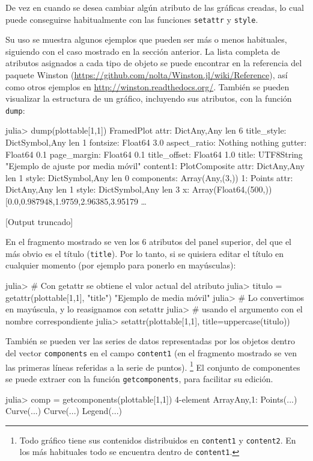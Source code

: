 ﻿\documentclass{article}
\newcommand{\code}{\texttt}
\begin{document}
De vez en cuando se desea cambiar algún atributo de las gráficas creadas, lo cual puede conseguirse habitualmente con las funciones \code{setattr} y \code{style}.

Su uso se muestra algunos ejemplos que pueden ser más o menos habituales, siguiendo con el caso mostrado en la sección anterior. La lista completa de atributos asignados a cada tipo de objeto se puede encontrar en la referencia del paquete Winston (\url{https://github.com/nolta/Winston.jl/wiki/Reference}), así como otros ejemplos en \url{http://winston.readthedocs.org/}. También se pueden visualizar la estructura de un gráfico, incluyendo sus atributos, con la función \code{dump}:
 
julia> dump(plottable[1,1])
FramedPlot 
  attr: Dict{Any,Any} len 6
    title_style: Dict{Symbol,Any} len 1
      fontsize: Float64 3.0
    aspect_ratio: Nothing nothing
    gutter: Float64 0.1
    page_margin: Float64 0.1
    title_offset: Float64 1.0
    title: UTF8String "Ejemplo de ajuste por media móvil"
  content1: PlotComposite 
    attr: Dict{Any,Any} len 1
      style: Dict{Symbol,Any} len 0
    components: Array(Any,(3,))
      1: Points 
        attr: Dict{Any,Any} len 1
          style: Dict{Symbol,Any} len 3
        x: Array(Float64,(500,)) [0.0,0.987948,1.9759,2.96385,3.95179 …  

[Output truncado]

En el fragmento mostrado se ven los 6 atributos del panel superior, del que el más obvio es el título (\code{title}). Por lo tanto, si se quisiera editar el título en cualquier momento (por ejemplo para ponerlo en mayúsculas):

julia> # Con getattr se obtiene el valor actual del atributo
julia> titulo = getattr(plottable[1,1], "title")
"Ejemplo de media móvil"
julia> # Lo convertimos en mayúscula, y lo reasignamos con setattr
julia> # usando el argumento con el nombre correspondiente
julia> setattr(plottable[1,1], title=uppercase(titulo))

También se pueden ver las series de datos representadas por los objetos dentro del vector \code{components} en el campo \code{content1} (en el fragmento mostrado se ven las primeras líneas referidas a la serie de puntos).%
\footnote{%
Todo gráfico tiene sus contenidos distribuidos en \code{content1} y
\code{content2}. En los más habituales todo se encuentra dentro de
\code{content1}.%
} 
El conjunto de componentes se puede extraer con la función \code{getcomponents}, para facilitar su edición.

julia> comp = getcomponents(plottable[1,1])
4-element Array{Any,1}:
 Points(...)
 Curve(...) 
 Curve(...) 
 Legend(...)
\end{document}
